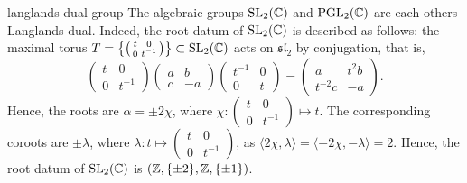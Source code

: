 \begin{example}{langlands-dual-group}
    The algebraic groups $\textup{SL}_2(\mathbb{C})$ and $\textup{PGL}_2(\mathbb{C})$ are each others Langlands dual. Indeed, the root datum of $\textup{SL}_2(\mathbb{C})$ is described as follows: the maximal torus $T = \left\{ \left( \begin{smallmatrix} t & 0 \\ 0 & t^{-1} \end{smallmatrix} \right) \right\} \subset \textup{SL}_2(\mathbb{C})$ acts on $\mathfrak{sl}_2$ by conjugation, that is,
    \[ \begin{pmatrix} t & 0 \\ 0 & t^{-1} \end{pmatrix} \begin{pmatrix} a & b \\ c & -a \end{pmatrix} \begin{pmatrix} t^{-1} & 0 \\ 0 & t \end{pmatrix} = \begin{pmatrix} a & t^2 b \\ t^{-2} c & -a \end{pmatrix} . \]
    Hence, the roots are $\alpha = \pm 2 \chi$, where $\chi : \left( \begin{smallmatrix} t & 0 \\ 0 & t^{-1} \end{smallmatrix} \right) \mapsto t$. The corresponding coroots are $\pm \lambda$, where $\lambda : t \mapsto \left( \begin{smallmatrix} t & 0 \\ 0 & t^{-1} \end{smallmatrix} \right)$, as $\langle 2 \chi, \lambda \rangle = \langle - 2 \chi, - \lambda \rangle = 2$. Hence, the root datum of $\textup{SL}_2(\mathbb{C})$ is $(\mathbb{Z}, \{ \pm 2 \}, \mathbb{Z}, \{ \pm 1 \})$.
    

\end{example}
